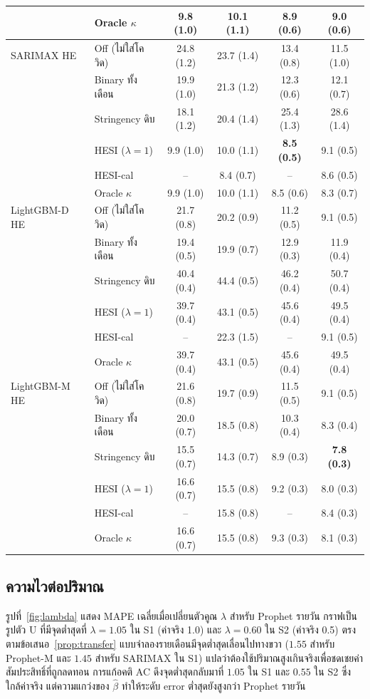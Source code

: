 \documentclass{article}
\theoremstyle{definition}
\begin{document}
\begin{table}[!tb]
\begin{tabular}{llcccc}
 & Oracle $\kappa$ & 9.8 (1.0) & 10.1 (1.1) & 8.9 (0.6) & 9.0 (0.6) \\
\midrule
SARIMAX HE & Off (ไม่ใส่โควิด) & 24.8 (1.2) & 23.7 (1.4) & 13.4 (0.8) & 11.5 (1.0) \\
 & Binary ทั้งเดือน & 19.9 (1.0) & 21.3 (1.2) & 12.3 (0.6) & 12.1 (0.7) \\
 & Stringency ดิบ & 18.1 (1.2) & 20.4 (1.4) & 25.4 (1.3) & 28.6 (1.4) \\
 & HESI ($\lambda{=}1$) & 9.9 (1.0) & 10.0 (1.1) & \textbf{8.5 (0.5)} & 9.1 (0.5) \\
 & HESI-cal & -- & 8.4 (0.7) & -- & 8.6 (0.5) \\
 & Oracle $\kappa$ & 9.9 (1.0) & 10.0 (1.1) & 8.5 (0.6) & 8.3 (0.7) \\
\midrule
LightGBM-D HE & Off (ไม่ใส่โควิด) & 21.7 (0.8) & 20.2 (0.9) & 11.2 (0.5) & 9.1 (0.5) \\
 & Binary ทั้งเดือน & 19.4 (0.5) & 19.9 (0.7) & 12.9 (0.3) & 11.9 (0.4) \\
 & Stringency ดิบ & 40.4 (0.4) & 44.4 (0.5) & 46.2 (0.4) & 50.7 (0.4) \\
 & HESI ($\lambda{=}1$) & 39.7 (0.4) & 43.1 (0.5) & 45.6 (0.4) & 49.5 (0.4) \\
 & HESI-cal & -- & 22.3 (1.5) & -- & 9.1 (0.5) \\
 & Oracle $\kappa$ & 39.7 (0.4) & 43.1 (0.5) & 45.6 (0.4) & 49.5 (0.4) \\
\midrule
LightGBM-M HE & Off (ไม่ใส่โควิด) & 21.6 (0.8) & 19.7 (0.9) & 11.5 (0.5) & 9.1 (0.5) \\
 & Binary ทั้งเดือน & 20.0 (0.7) & 18.5 (0.8) & 10.3 (0.4) & 8.3 (0.4) \\
 & Stringency ดิบ & 15.5 (0.7) & 14.3 (0.7) & 8.9 (0.3) & \textbf{7.8 (0.3)} \\
 & HESI ($\lambda{=}1$) & 16.6 (0.7) & 15.5 (0.8) & 9.2 (0.3) & 8.0 (0.3) \\
 & HESI-cal & -- & 15.8 (0.8) & -- & 8.4 (0.3) \\
 & Oracle $\kappa$ & 16.6 (0.7) & 15.5 (0.8) & 9.3 (0.3) & 8.1 (0.3) \\
\bottomrule
\end{tabular}
\end{table}

\subsection{ความไวต่อปริมาณ}
รูปที่~\ref{fig:lambda} แสดง MAPE เฉลี่ยเมื่อเปลี่ยนตัวคูณ $\lambda$ สำหรับ Prophet รายวัน กราฟเป็นรูปตัว U ที่มีจุดต่ำสุดที่ $\lambda=1.05$ ใน S1 (ค่าจริง 1.0) และ $\lambda=0.60$ ใน S2 (ค่าจริง 0.5) ตรงตามข้อเสนอ~\ref{prop:transfer} แบบจำลองรายเดือนมีจุดต่ำสุดเลื่อนไปทางขวา ($1.55$ สำหรับ Prophet-M และ $1.45$ สำหรับ SARIMAX ใน S1) แปลว่าต้องใช้ปริมาณสูงเกินจริงเพื่อชดเชยค่าสัมประสิทธิ์ที่ถูกลดทอน การแก้อคติ AC ดึงจุดต่ำสุดกลับมาที่ $1.05$ ใน S1 และ $0.55$ ใน S2 ซึ่งใกล้ค่าจริง แต่ความแกว่งของ $\hat\beta$ ทำให้ระดับ error ต่ำสุดยังสูงกว่า Prophet รายวัน
\end{document}
